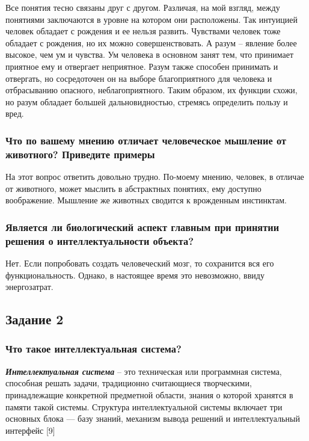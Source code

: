 \documentclass[14pt,a4paper,report]{report}
\begin{document}
Все понятия тесно связаны друг с другом. Различая, на мой взгляд, между понятиями заключаются в уровне на котором они расположены. Так интуицией человек обладает с рождения и ее нельзя развить. Чувствами человек тоже обладает с рождения, но их можно совершенствовать. А разум – явление более высокое, чем ум и чувства. Ум человека в основном занят тем, что принимает приятное ему и отвергает неприятное. Разум также способен принимать и отвергать, но сосредоточен он на выборе благоприятного для человека и отбрасыванию опасного, неблагоприятного. Таким образом, их функции схожи, но разум обладает большей дальновидностью, стремясь определить пользу и вред.

\subsubsection{Что по вашему мнению отличает человеческое мышление от животного? Приведите примеры}

На этот вопрос ответить довольно трудно. По-моему мнению, человек, в отличае от животного, может мыслить в абстрактных понятиях, ему доступно воображение. Мышление же животных сводится к врожденным инстинктам.

\subsubsection{Является ли биологический аспект главным при принятии решения о интеллектуальности объекта?}

Нет. Если попробовать создать человеческий мозг, то сохранится вся его функциональность. Однако, в настоящее время это невозможно, ввиду энергозатрат.

\subsection{Задание 2}

\subsubsection{Что такое интеллектуальная система?}

\emph{\textbf{Интеллектуальная система}} -- это техническая или программная система, способная решать задачи, традиционно считающиеся творческими, принадлежащие конкретной предметной области, знания о которой хранятся в памяти такой системы. Структура интеллектуальной системы включает три основных блока — базу знаний, механизм вывода решений и интеллектуальный интерфейс [9] 
\end{document}
